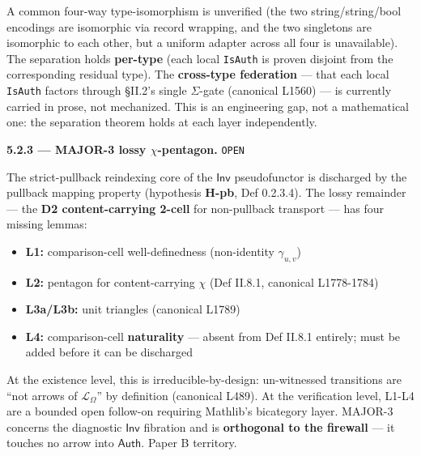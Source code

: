 \documentclass[
  10pt,
]{article}
\providecommand{\tightlist}{%
  \setlength{\itemsep}{0pt}\setlength{\parskip}{0pt}}
\providecommand{\tightlist}{%
  \setlength{\itemsep}{0pt}\setlength{\parskip}{0pt}}
\DeclareRobustCommand{\texttt}[1]{{\paperSymbolFont\nolinkurl{#1}}}
\begin{document}
A common four-way type-isomorphism is unverified (the two string/string/bool encodings are isomorphic via record wrapping, and the two singletons are isomorphic to each other, but a uniform adapter across all four is unavailable). The separation holds \textbf{per-type} (each local \texttt{IsAuth} is proven disjoint from the corresponding residual type). The \textbf{cross-type federation} --- that each local \texttt{IsAuth} factors through §II.2's single \protect\hypertarget{math-E0080-0120}{}{\(\Sigma\)}-gate (canonical L1560) --- is currently carried in prose, not mechanized. This is an engineering gap, not a mathematical one: the separation theorem holds at each layer independently.

\textbf{5.2.3 --- MAJOR-3 lossy \protect\hypertarget{math-E0081-0121}{}{\(\chi\)}-pentagon.} \texttt{OPEN}

The strict-pullback reindexing core of the \protect\hypertarget{math-E0082-0122}{}{\(\mathsf{Inv}\)} pseudofunctor is discharged by the pullback mapping property (hypothesis \textbf{H-pb}, Def 0.2.3.4). The lossy remainder --- the \textbf{D2 content-carrying 2-cell} for non-pullback transport --- has four missing lemmas:

\begin{itemize}
\tightlist
\item
  \textbf{L1:} comparison-cell well-definedness (non-identity \protect\hypertarget{math-E0083-0123}{}{\(\gamma_{u,v}\)})
\item
  \textbf{L2:} pentagon for content-carrying \protect\hypertarget{math-E0081-0124}{}{\(\chi\)} (Def II.8.1, canonical L1778-1784)
\item
  \textbf{L3a/L3b:} unit triangles (canonical L1789)
\item
  \textbf{L4:} comparison-cell \textbf{naturality} --- absent from Def II.8.1 entirely; must be added before it can be discharged
\end{itemize}

At the existence level, this is irreducible-by-design: un-witnessed transitions are ``not arrows of \protect\hypertarget{math-E0084-0125}{}{\(\mathcal{L}_\Omega\)}'' by definition (canonical L489). At the verification level, L1-L4 are a bounded open follow-on requiring Mathlib's bicategory layer. MAJOR-3 concerns the diagnostic \protect\hypertarget{math-E0082-0126}{}{\(\mathsf{Inv}\)} fibration and is \textbf{orthogonal to the firewall} --- it touches no arrow into \protect\hypertarget{math-E0039-0127}{}{\(\mathsf{Auth}\)}. Paper B territory.
\end{document}
